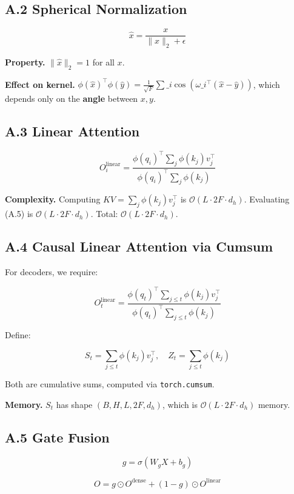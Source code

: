 \subsection{A.2 Spherical Normalization}

\[
\hat{x} = \frac{x}{\|x\|_2 + \epsilon}
\]

\textbf{Property.} $\|\hat{x}\|_2 = 1$ for all $x$.

\textbf{Effect on kernel.} $\phi(\hat{x})^\top \phi(\hat{y}) = \frac{1}{\sqrt{F}} 
\sum\_i \cos(\omega\_i^\top (\hat{x} - \hat{y}))$, which depends only on the 
\textbf{angle} between $x, y$.

\subsection{A.3 Linear Attention}

\[
O_i^\text{linear} = \frac{\phi(q_i)^\top \sum_j \phi(k_j) v_j^\top}{\phi(q_i)^\top \sum_j \phi(k_j)}
\]

\textbf{Complexity.} Computing $KV = \sum_j \phi(k_j) v_j^\top$ is 
$\mathcal{O}(L \cdot 2F \cdot d_h)$. Evaluating (A.5) is $\mathcal{O}(L \cdot 2F \cdot d_h)$. Total: $\mathcal{O}(L \cdot 2F \cdot d_h)$.

\subsection{A.4 Causal Linear Attention via Cumsum}

For decoders, we require:

\[
O_t^\text{linear} = \frac{\phi(q_t)^\top \sum_{j \leq t} \phi(k_j) v_j^\top}{\phi(q_t)^\top \sum_{j \leq t} \phi(k_j)}
\]

Define:

\[
S_t = \sum_{j \leq t} \phi(k_j) v_j^\top, \quad
Z_t = \sum_{j \leq t} \phi(k_j)
\]

Both are cumulative sums, computed via \texttt{torch.cumsum}.

\textbf{Memory.} $S_t$ has shape $(B, H, L, 2F, d_h)$, which is 
$\mathcal{O}(L \cdot 2F \cdot d_h)$ memory.

\subsection{A.5 Gate Fusion}

\[
g = \sigma(W_g X + b_g)
\]

\[
O = g \odot O^\text{dense} + (1 - g) \odot O^\text{linear}
\]

